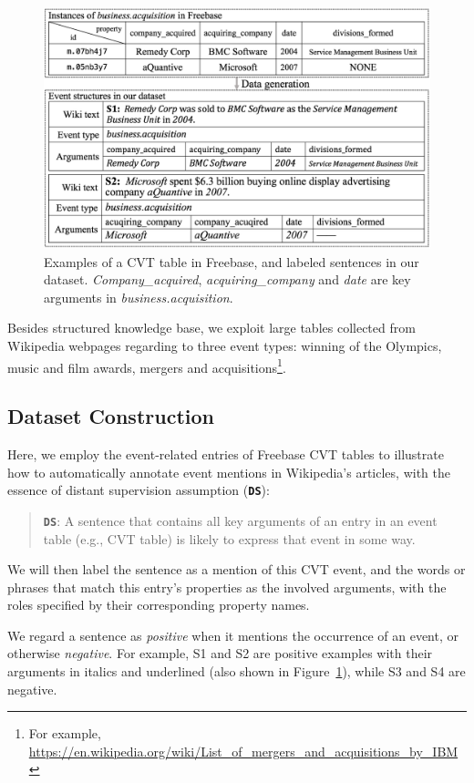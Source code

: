\begin{figure}[h]
	\centering
	\includegraphics[width=.48\textwidth]{temp}
	\caption{Examples of a CVT table in Freebase, and labeled sentences in our dataset. \emph{Company\_acquired}, \emph{acquiring\_company} and \emph{date} are key arguments in \emph{business.acquisition}. \label{fig:3}}
\end{figure}

Besides structured knowledge base, we exploit large tables collected from Wikipedia webpages regarding to three event types: winning of the Olympics, music and film awards, mergers and acquisitions\footnote{For example, \url{https://en.wikipedia.org/wiki/List_of_mergers_and_acquisitions_by_IBM}}.

\subsection{Dataset Construction\label{datagen}} 
Here, we employ the event-related entries of Freebase CVT tables to illustrate how to automatically annotate event mentions in Wikipedia's articles, with the essence of distant supervision assumption (\textbf{\texttt{DS}}):
\begin{quote}
	\textbf{\texttt{DS}}: A sentence that contains all key arguments of an entry in an event table (e.g., CVT table) is likely to express that event in some way.
\end{quote}
We will then label the sentence as a mention of this CVT event, and the words or phrases that match this entry's properties as the involved arguments, with the roles specified by their corresponding property names. 

We regard a sentence as \emph{positive} when it mentions the occurrence of an event, or otherwise \emph{negative}. 
For example, S1 and S2 are positive examples with their arguments in italics and underlined (also shown in Figure~\ref{fig:3}), while S3 and S4 are negative.

